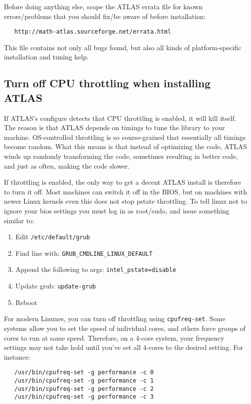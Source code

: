 \documentclass[11pt]{article}
\begin{document}
Before doing anything else, scope the ATLAS errata file for known 
errors/problems that you should fix/be aware of before installation:
\vspace*{-0.1in}
\begin{verbatim}
   http://math-atlas.sourceforge.net/errata.html
\end{verbatim}

This file contains not only all bugs found, but also all kinds
of platform-specific installation and tuning help.

\subsection{Turn off CPU throttling when installing ATLAS}
\label{sec-throttle}
If ATLAS's configure detects that CPU throttling is enabled, it will kill
itself.  The reason is that ATLAS depends on timings to tune the library
to your machine.  OS-controlled throttling is so course-grained that 
essentially all timings become random.  What this means is that instead
of optimizing the code, ATLAS winds up randomly transforming the code,
sometimes resulting in better code, and just as often, making the code
slower.

If throttling is enabled, the only way to get a decent ATLAS install is
therefore to turn it off.  Most machines can switch it off in the BIOS,
but on machines with newer Linux kernels even this does not stop pstate
throttling.  To tell linux not to ignore your bios settings you must
log in as root/sudo, and issue something similar to:
\begin{enumerate}
\item Edit \verb+/etc/default/grub+
\item Find line with: \verb+GRUB_CMDLINE_LINUX_DEFAULT+
\item Append the following to args: \verb+intel_pstate=disable+
\item Update grub: \verb+update-grub+
\item Reboot
\end{enumerate}

For modern Linuxes, you can turn off throttling using \verb+cpufreq-set+.
Some systems allow you to set the speed of individual cores, and others
force groups of cores to run at same speed.  Therefore, on a 4-core
system, your frequency settings may not take hold until you've set all
4-cores to the desired setting.  For instance:
\begin{verbatim}
   /usr/bin/cpufreq-set -g performance -c 0
   /usr/bin/cpufreq-set -g performance -c 1
   /usr/bin/cpufreq-set -g performance -c 2
   /usr/bin/cpufreq-set -g performance -c 3
\end{verbatim}
\end{document}
